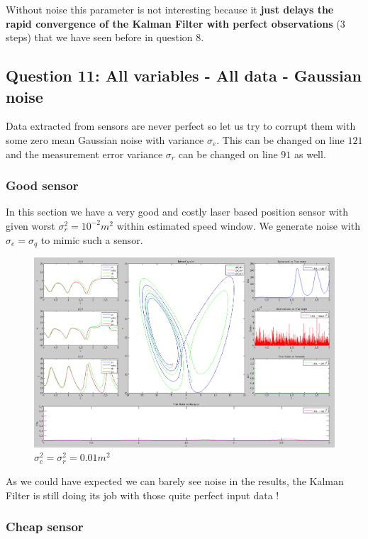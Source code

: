 \documentclass[11pt,a4paper]{article}
\begin{document}
Without noise this parameter is not interesting because it \textbf{just delays the rapid convergence of the Kalman Filter with perfect observations} (3 steps) that we have seen before in question 8.

\clearpage
\subsection{Question 11: All variables - All data - Gaussian noise}

\vskip 0.3cm
Data extracted from sensors are never perfect so let us try to corrupt them with some zero mean Gaussian noise with variance $\sigma_e$. This can be changed on line $121$ and the measurement error variance $\sigma_r$ can be changed on line $91$ as well.

\subsubsection{Good sensor}

\vskip 0.3cm
In this section we have a very good and costly laser based position sensor with given worst $\sigma_r^2 = 10^{-2}m^2$ within estimated speed window. We generate noise with $\sigma_e = \sigma_q$ to mimic such a sensor.

\vskip 0.5cm
\begin{figure}[H]
   \includegraphics[width=16cm]{Q11a.png}
   \caption{$\sigma_e^2 = \sigma_r^2 = 0.01 m^2$}
\end{figure}

\vskip 0.5cm
As we could have expected we can barely see noise in the results, the Kalman Filter is still doing its job with those quite perfect input data !

\clearpage 
\subsubsection{Cheap sensor}
\end{document}
